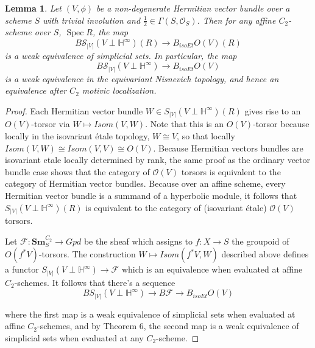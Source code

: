 \documentclass[edeposit,fullpage]{uiucthesis2009}
\newcommand{\Z}{\mathbb Z}
\newcommand{\mbb}{\mathbb}
\newcommand{\mc}{\mathcal}
\newcommand{\Sm}[1]{\mathbf{Sm}_{#1}}
\DeclareMathOperator{\Spec}{Spec}
\theoremstyle{plain}
\newtheorem{lemma}{Lemma}
\numberwithin{lemma}{section}
\theoremstyle{definition}
\begin{document}
\begin{lemma} \label{lem:weqaff}
Let $(V,\phi)$ be a non-degenerate Hermitian vector bundle over a
scheme $S$ with trivial involution and $\frac{1}{2} \in \Gamma(S,\mc
O_S)$. Then for any affine $C_2$-scheme over $S$, $\Spec R$, the map
\[
B\mc S_{|V|}(V\perp \mbb H^\infty)(R) \rightarrow B_{isoEt}O(V)(R)
\]
is a weak equivalence of simplicial sets. In particular, the map
\[
B\mc S_{|V|}(V\perp \mbb H^\infty) \rightarrow B_{isoEt}O(V)
\]
is a weak equivalence in the equivariant Nisnevich topology, and hence an
equivalence after $C_2$ motivic localization. 
\end{lemma}

\begin{proof}




Each Hermitian vector bundle $W  \in S_{|V|}(V\perp \mbb H^\infty)(R)$
gives rise to an $ O(V)$-torsor via $W \mapsto Isom(V,W)$. Note
that this is an $O(V)$-torsor because locally in the isovariant
\'etale topology, $W \cong V$,
so that locally $Isom(V,W) \cong Isom(V,V) \cong 
O(V)$. Because Hermitian vectors bundles are isovariant etale locally
determined by rank, the same proof as the ordinary vector bundle case shows
that the category of $\mc O(V)$ torsors is equivalent to the category
of Hermitian vector bundles. Because over an affine scheme, every
Hermitian vector bundle is a summand of a hyperbolic module, it
follows that $S_{|V|}(V\perp \mbb H^\infty)(R)$ is equivalent to the
category of (isovariant \'etale) $\mc O(V)$ torsors. 

Let $\mc F : \Sm{S}^{C_2} \rightarrow Gpd$ be the sheaf which assigns
to $f : X \rightarrow S$ the groupoid of $ O(f^*V)$-torsors. The
construction $W \mapsto Isom(f^*V,W)$ described above defines a
functor $S_{|V|}(V\perp \mbb H^\infty) \rightarrow \mc F$ which is an
equivalence when evaluated at affine $C_2$-schemes. It follows that
there's a sequence
\[
B S_{|V|}(V\perp \mbb H^\infty) \rightarrow B\mc F \rightarrow B_{isoEt}O(V)
\]

where the first map is a weak equivalence of simplicial sets when
evaluated at affine $C_2$-schemes, and by \cite{Jar01} Theorem 6, the second map is a
weak equivalence of simplicial sets when evaluated at any
$C_2$-scheme. 
\end{proof}
\end{document}
